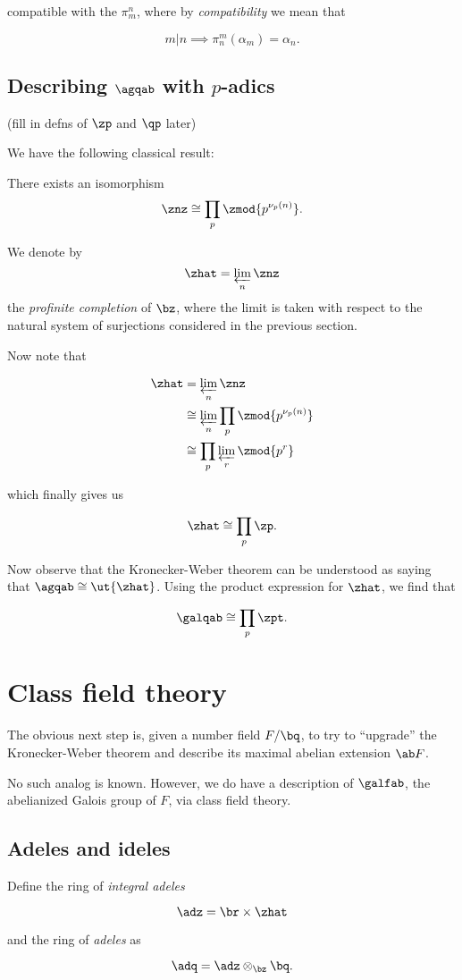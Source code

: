 \documentclass{article}
\begin{document}
compatible with the $\pi_m^n$, where by
\textit{compatibility} we mean that

\[ m|n \implies \pi_n^m(\alpha_m) = \alpha_n. \]

\subsection{Describing $\agqab$ with $p$-adics}
(fill in defns of $\zp$ and $\qp$ later)

We have the following classical result:

\begin{thm}
  There exists an isomorphism
  \[ \znz \cong \prod_p \zmod {p^{\nu_p(n)}}. \]
\end{thm}

\begin{defn}
  We denote by
  \[ \zhat = \varprojlim_n \znz \]
  the \textit{profinite completion} of $\bz$, where the limit is taken with
  respect to the natural system of surjections considered in the previous section.
\end{defn}

Now note that

\begin{align*}
  \zhat &= \varprojlim_n \znz \\
        &\cong \varprojlim_n \prod_p \zmod {p^{\nu_p(n)}} \\
        &\cong \prod_p \varprojlim_r \zmod {p^r} 
\end{align*}

which finally gives us

\[ \zhat \cong \prod_p \zp. \]

Now observe that the Kronecker-Weber theorem can be understood as saying that
$\agqab \cong \ut{\zhat}$. Using the product expression for $\zhat$, we find
that

\[ \galqab \cong \prod_p \zpt. \]

\section{Class field theory}
The obvious next step is, given a number field $F/\bq$, to try to ``upgrade''
the Kronecker-Weber theorem and describe its maximal abelian extension $\ab F$.

No such analog is known. However, we do have a description of $\galfab$, the
abelianized Galois group of $F$, via class field theory.

\subsection{Adeles and ideles}
\label{sec:adeles-ideles}

Define the ring of \textit{integral adeles}

\[ \adz = \br \times \zhat \]

and the ring of \textit{adeles} as

\[ \adq = \adz \otimes_\bz \bq. \]
\end{document}
